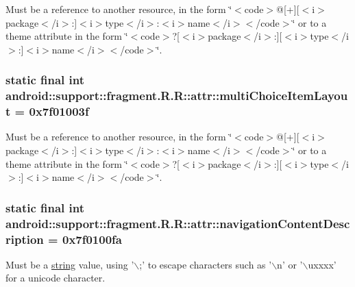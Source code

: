 Must be a reference to another resource, in the form \char`\"{}$<$code$>$@\mbox{[}+\mbox{]}\mbox{[}$<$i$>$package$<$/i$>$:\mbox{]}$<$i$>$type$<$/i$>$:$<$i$>$name$<$/i$>$$<$/code$>$\char`\"{} or to a theme attribute in the form \char`\"{}$<$code$>$?\mbox{[}$<$i$>$package$<$/i$>$:\mbox{]}\mbox{[}$<$i$>$type$<$/i$>$:\mbox{]}$<$i$>$name$<$/i$>$$<$/code$>$\char`\"{}. \hypertarget{classandroid_1_1support_1_1fragment_1_1_r_1_1attr_8a2253dd66242db2bbccba99640b2d5b}{
\subsubsection[{multiChoiceItemLayout}]{\setlength{\rightskip}{0pt plus 5cm}static final int android::support::fragment.R.R::attr::multiChoiceItemLayout = 0x7f01003f}}
\label{classandroid_1_1support_1_1fragment_1_1_r_1_1attr_8a2253dd66242db2bbccba99640b2d5b}


Must be a reference to another resource, in the form \char`\"{}$<$code$>$@\mbox{[}+\mbox{]}\mbox{[}$<$i$>$package$<$/i$>$:\mbox{]}$<$i$>$type$<$/i$>$:$<$i$>$name$<$/i$>$$<$/code$>$\char`\"{} or to a theme attribute in the form \char`\"{}$<$code$>$?\mbox{[}$<$i$>$package$<$/i$>$:\mbox{]}\mbox{[}$<$i$>$type$<$/i$>$:\mbox{]}$<$i$>$name$<$/i$>$$<$/code$>$\char`\"{}. \hypertarget{classandroid_1_1support_1_1fragment_1_1_r_1_1attr_e81417c72fb359d62a2c2bfc9b726db8}{
\subsubsection[{navigationContentDescription}]{\setlength{\rightskip}{0pt plus 5cm}static final int android::support::fragment.R.R::attr::navigationContentDescription = 0x7f0100fa}}
\label{classandroid_1_1support_1_1fragment_1_1_r_1_1attr_e81417c72fb359d62a2c2bfc9b726db8}


Must be a \hyperlink{classandroid_1_1support_1_1fragment_1_1_r_1_1string}{string} value, using '$\backslash$;' to escape characters such as '$\backslash$n' or '$\backslash$uxxxx' for a unicode character. 


